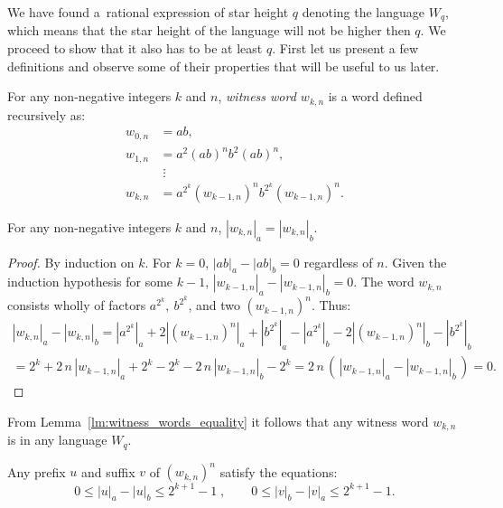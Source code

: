 We have found a~rational expression of star height $q$ denoting the language $W_q$, which means that the star height of the language will not be higher then $q$. We proceed to show that it also has to be at least $q$. First let us present a few definitions and observe some of their properties that will be useful to us later.

\begin{defn}
    For any non-negative integers $k$ and $n$, \emph{witness word $w_{k,n}$} is a word defined recursively as:
    \begin{align*}
        w_{0,n} &= ab,\\
        w_{1,n} &= a^2 {(ab)}^n b^2 {(ab)}^n,\\
                &\; \vdots \\
        w_{k,n} &= a^{2^k} {(w_{k-1,n})}^n b^{2^k} {(w_{k-1,n})}^n.
    \end{align*}
\end{defn}

\begin{lemma}\label{lm:witness_words_equality}
    For any non-negative integers $k$ and $n$, $|w_{k,n}|_a = |w_{k,n}|_b$.
\end{lemma}

\begin{proof}
    By induction on $k$. For $k = 0$, $|ab|_a - |ab|_b = 0$ regardless of $n$. Given the induction hypothesis for some $k - 1$, $|w_{k-1,n}|_a - |w_{k-1,n}|_b = 0$. The word $w_{k,n}$ consists wholly of factors $a^{2^k}, \: b^{2^k}$, and two ${(w_{k-1,n})}^n$. Thus:
    \begin{multline*}
        |w_{k,n}|_a - |w_{k,n}|_b = |a^{2^k}|_a + 2|{(w_{k-1,n})}^n|_a + |b^{2^k}|_a - |a^{2^k}|_b - 2|{(w_{k-1,n})}^n|_b - |b^{2^k}|_b \\
        = 2^k + 2 \, n \, |w_{k-1,n}|_a + 2^k - 2^k - 2 \, n \, |w_{k-1,n}|_b - 2^k = 2 \, n \, ( \, |w_{k-1,n}|_a - |w_{k-1,n}|_b \, ) = 0.
    \end{multline*}
\end{proof}

From Lemma~\ref*{lm:witness_words_equality} it follows that any witness word $w_{k,n}$ is in any language $W_q$.

\begin{lemma}\label{lm:witness_words_inequalities}
    Any prefix $u$ and suffix $v$ of ${(w_{k,n})}^n$ satisfy the equations:
    \[
        0 \leq |u|_a - |u|_b \leq 2^{k+1}-1 \; , \qquad 0 \leq |v|_b - |v|_a \leq 2^{k+1}-1.
    \]
\end{lemma}

